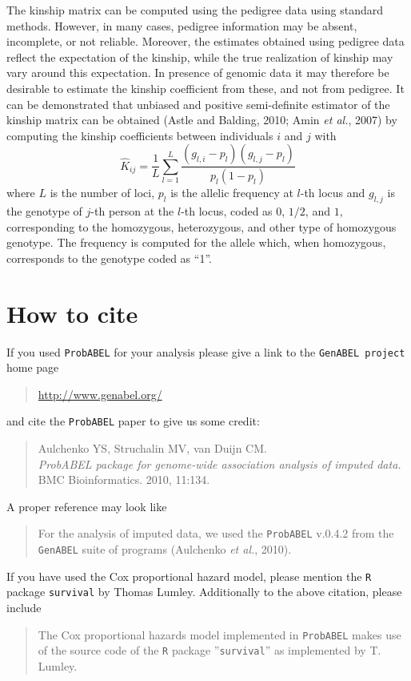 \documentclass[12pt,a4paper]{article}
\newcommand{\PA}{\texttt{ProbABEL}}
\begin{document}
The kinship matrix can be computed using the pedigree data using standard methods.
However, in many cases, pedigree information may be absent, incomplete, or not
reliable. Moreover, the estimates obtained using pedigree data reflect the
expectation of the kinship, while the true realization of kinship may vary
around this expectation. In presence of genomic data it may therefore be
desirable to estimate the kinship coefficient from these, and not from pedigree.
It can be demonstrated that unbiased and positive semi-definite estimator
of the kinship matrix can be obtained (Astle and Balding, 2010; Amin \emph{et al.}, 2007)
by computing the kinship coefficients between individuals $i$ and $j$ with
$$
\hat{K}_{ij} = \frac{1}{L} \sum_{l=1}^L \frac{ (g_{l,i} - p_l) (g_{l,j} - p_l) }{ p_l (1-p_l) }
$$
where $L$ is the number of loci, $p_l$ is the allelic frequency at $l$-th locus
and $g_{l,j}$ is the genotype of $j$-th person at the $l$-th locus, coded
as $0$, $1/2$, and $1$, corresponding to the homozygous, heterozygous, and
other type of homozygous genotype. The frequency is computed for the allele
which, when homozygous, corresponds to the genotype coded as ``1''.


\section{How to cite}

If you used \PA{} for your analysis please give a link to the
\texttt{GenABEL project} home page
\begin{quote}
\url{http://www.genabel.org/}
\end{quote}
and cite the \PA{} paper to give us some credit:
\begin{quote}
Aulchenko YS, Struchalin MV, van Duijn CM.\\
\emph{ProbABEL package for genome-wide association analysis of imputed data.}\\
BMC Bioinformatics. 2010, 11:134.
\end{quote}
A proper reference may look like
\begin{quote}
For the analysis of imputed data, we used the \PA{} v.0.4.2
from the \texttt{GenABEL} suite of programs (Aulchenko \emph{et al.}, 2010).
\end{quote}

If you have used the Cox proportional hazard model, please mention the
\texttt{R} package \texttt{survival} by Thomas Lumley. Additionally
to the above citation, please include
\begin{quote}
The Cox proportional hazards model implemented in \PA{}
makes use of the source code of the \texttt{R} package ''\texttt{survival}''
as implemented by T. Lumley.
\end{quote}
\end{document}
